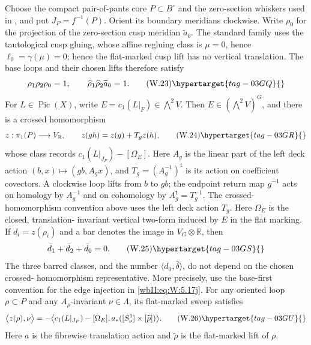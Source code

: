 \begin{lemma}
\hypertarget{tag-03IC}{}\label{wbII:lem:picard-crossed-defect}

Choose the compact pair-of-pants core $P\subset B^\circ$ and
the zero-section whiskers used in , and put
$J_P=f^{-1}(P)$.  Orient its boundary meridians clockwise.  Write
$\rho_0$ for the projection of the zero-section cusp meridian
$\widetilde a_0$.  The standard family uses the tautological cusp
gluing, whose affine regluing class is $\mu=0$, hence
$\ell_0=\gamma(\mu)=0$; hence the flat-marked cusp lift has no vertical
translation.  The base loops and their chosen lifts therefore satisfy
\[
 \rho_1\rho_2\rho_0=1,
 \qquad
 \widehat\rho_1\widehat\rho_2\widetilde a_0=1.
\tag{W.23}\hypertarget{tag-03GQ}{}\label{wbII:eq:W:5.17g}
\]
For $L\in\operatorname{Pic}(X)$, write
$E=c_1(L|_F)\in\bigwedge^2V$.  Then $E\in(\bigwedge^2V)^G$, and there is a
crossed homomorphism
\[
 z:\pi_1(P)\longrightarrow V_{\mathbb R},\qquad
 z(gh)=z(g)+T_gz(h),
\tag{W.24}\hypertarget{tag-03GR}{}\label{wbII:eq:W:5.17h}
\]
whose class records
$c_1(L|_{J_P})-[\Omega_E]$.  Here $A_g$ is the linear part of the
left deck action $(b,x)\mapsto(gb,A_gx)$, and
$T_g=(A_g^{-1})^{\mathsf t}$ is its action on coefficient covectors.
A clockwise loop lifts from $b$ to $gb$; the endpoint return map $g^{-1}$
acts on homology by $A_g^{-1}$ and on cohomology by $A_g^{\mathsf t}=T_g^{-1}$.
The crossed-homomorphism convention above uses the left deck action $T_g$.  Here $\Omega_E$ is the closed, translation-
invariant vertical two-form induced by $E$ in the flat marking.  If
$d_i=z(\rho_i)$ and a bar denotes the image in
$V_G\otimes\mathbb R$, then
\[
 \bar d_1+\bar d_2+\bar d_0=0.
\tag{W.25}\hypertarget{tag-03GS}{}\label{wbII:eq:W:5.17i}
\]
The three barred classes, and the number
$\langle d_0,\widehat\delta\rangle$, do not depend on the chosen crossed-
homomorphism representative.  More precisely, use the base-first convention
for the edge injection in \eqref{wbII:eq:W:5.17j}.  For any oriented loop $\rho\subset P$
and any $A_\rho$-invariant $\nu\in\Lambda$, its flat-marked sweep satisfies
\[
 \bigl\langle z(\rho),\nu\bigr\rangle
 =-\bigl\langle c_1(L|_{J_P})-[\Omega_E],
 a_*([S^1_\nu]\times[\widetilde\rho])\bigr\rangle.
\tag{W.26}\hypertarget{tag-03GU}{}\label{wbII:eq:W:5.17j'}
\]
Here $a$ is the fibrewise translation action and $\widetilde\rho$ is the
flat-marked lift of $\rho$.
\end{lemma}



